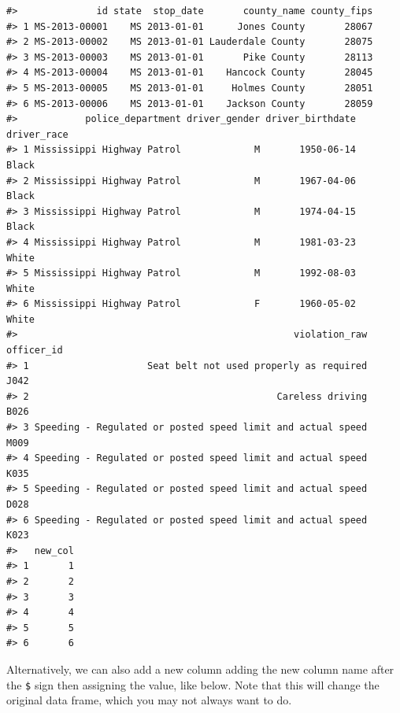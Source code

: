 \documentclass[]{book}
\newenvironment{Shaded}{\begin{snugshade}}{\end{snugshade}}
\newcommand{\KeywordTok}[1]{\textcolor[rgb]{0.13,0.29,0.53}{\textbf{#1}}}
\newcommand{\DecValTok}[1]{\textcolor[rgb]{0.00,0.00,0.81}{#1}}
\newcommand{\StringTok}[1]{\textcolor[rgb]{0.31,0.60,0.02}{#1}}
\newcommand{\CommentTok}[1]{\textcolor[rgb]{0.56,0.35,0.01}{\textit{#1}}}
\newcommand{\OtherTok}[1]{\textcolor[rgb]{0.56,0.35,0.01}{#1}}
\newcommand{\OperatorTok}[1]{\textcolor[rgb]{0.81,0.36,0.00}{\textbf{#1}}}
\newcommand{\NormalTok}[1]{#1}
\begin{document}
\begin{verbatim}
#>              id state  stop_date       county_name county_fips
#> 1 MS-2013-00001    MS 2013-01-01      Jones County       28067
#> 2 MS-2013-00002    MS 2013-01-01 Lauderdale County       28075
#> 3 MS-2013-00003    MS 2013-01-01       Pike County       28113
#> 4 MS-2013-00004    MS 2013-01-01    Hancock County       28045
#> 5 MS-2013-00005    MS 2013-01-01     Holmes County       28051
#> 6 MS-2013-00006    MS 2013-01-01    Jackson County       28059
#>            police_department driver_gender driver_birthdate driver_race
#> 1 Mississippi Highway Patrol             M       1950-06-14       Black
#> 2 Mississippi Highway Patrol             M       1967-04-06       Black
#> 3 Mississippi Highway Patrol             M       1974-04-15       Black
#> 4 Mississippi Highway Patrol             M       1981-03-23       White
#> 5 Mississippi Highway Patrol             M       1992-08-03       White
#> 6 Mississippi Highway Patrol             F       1960-05-02       White
#>                                                 violation_raw officer_id
#> 1                     Seat belt not used properly as required       J042
#> 2                                            Careless driving       B026
#> 3 Speeding - Regulated or posted speed limit and actual speed       M009
#> 4 Speeding - Regulated or posted speed limit and actual speed       K035
#> 5 Speeding - Regulated or posted speed limit and actual speed       D028
#> 6 Speeding - Regulated or posted speed limit and actual speed       K023
#>   new_col
#> 1       1
#> 2       2
#> 3       3
#> 4       4
#> 5       5
#> 6       6
\end{verbatim}

Alternatively, we can also add a new column adding the new column name
after the \texttt{\$} sign then assigning the value, like below. Note
that this will change the original data frame, which you may not always
want to do.

\begin{Shaded}
\end{Shaded}
\end{document}
